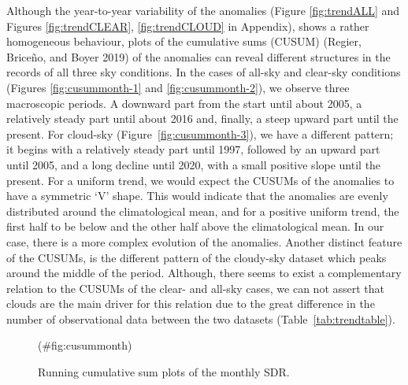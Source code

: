 \documentclass[
  preprint, 3p, authoryear]{article}
\begin{document}
Although the year-to-year variability of the anomalies (Figure \ref{fig:trendALL} and Figures \ref{fig:trendCLEAR}, \ref{fig:trendCLOUD} in Appendix), shows a rather homogeneous behaviour, plots of the cumulative sums (CUSUM) (Regier, Briceño, and Boyer 2019) of the anomalies can reveal different structures in the records of all three sky conditions.
In the cases of all-sky and clear-sky conditions (Figures \ref{fig:cusummonth-1} and \ref{fig:cusummonth-2}), we observe three macroscopic periods.
A downward part from the start until about 2005, a relatively steady part until about 2016 and, finally, a steep upward part until the present.
For cloud-sky (Figure~\ref{fig:cusummonth-3}), we have a different pattern; it begins with a relatively steady part until 1997, followed by an upward part until 2005, and a long decline until 2020, with a small positive slope until the present.
For a uniform trend, we would expect the CUSUMs of the anomalies to have a symmetric `V' shape.
This would indicate that the anomalies are evenly distributed around the climatological mean, and for a positive uniform trend, the first half to be below and the other half above the climatological mean.
In our case, there is a more complex evolution of the anomalies.
Another distinct feature of the CUSUMs, is the different pattern of the cloudy-sky dataset which peaks around the middle of the period.
Although, there seems to exist a complementary relation to the CUSUMs of the clear- and all-sky cases, we can not assert that clouds are the main driver for this relation due to the great difference in the number of observational data between the two datasets (Table~\ref{tab:trendtable}).

\begin{figure}[h!]

{\centering {}

}

\caption{Running cumulative sum plots of the monthly SDR.}(\#fig:cusummonth)
\end{figure}
\end{document}
